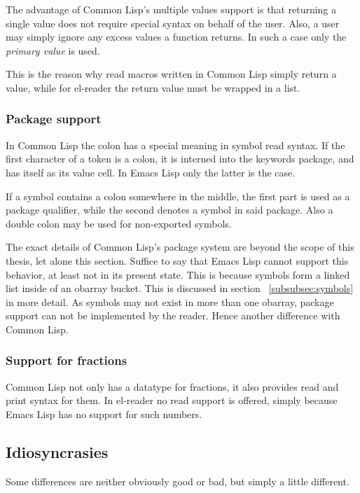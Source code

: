 \documentclass[a4paper,10pt,twoside]{report}
\newcommand{\el}{Emacs Lisp}
\newcommand{\cl}{Common Lisp}
\newcommand{\elr}{el-reader}
\begin{document}
The advantage of \cl{}’s multiple values support is that returning a single
value does not require special syntax on behalf of the user.  Also, a user may
simply ignore any excess values a function returns.  In such a case only the
\emph{primary value} is used.

This is the reason why read macros written in \cl{} simply return a value, while
for \elr{} the return value must be wrapped in a list.

\subsubsection{Package support}
\label{subsubsec:package-support}

In \cl{} the colon has a special meaning in symbol read syntax.  If the first
character of a token is a colon, it is interned into the keywords package, and
has itself as its value cell.  In \el{} only the latter is the case.

If a symbol contains a colon somewhere in the middle, the first part is used as
a package qualifier, while the second denotes a symbol in said package.  Also a
double colon may be used for non-exported symbols.

The exact details of \cl{}’s package system are beyond the scope of this thesis,
let alone this section.  Suffice to say that \el{} cannot support this behavior,
at least not in its present state.  This is because symbols form a linked list
inside of an obarray bucket.  This is discussed in section
~\ref{subsubsec:symbols} in more detail.  As symbols may not exist in more than
one obarray, package support can not be implemented by the reader.  Hence
another difference with \cl{}.

\subsubsection{Support for fractions}
\label{subsubsec:fractions}

\cl{} not only has a datatype for fractions, it also provides read and print
syntax for them.  In \elr{} no read support is offered, simply because \el{} has
no support for such numbers.

\subsection{Idiosyncrasies}
\label{subsec:idiosyncrasies}

Some differences are neither obviously good or bad, but simply a little
different.
\end{document}
